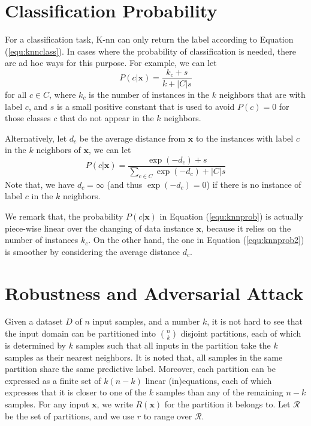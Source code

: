 \section{Classification Probability} 

For a classification task, K-nn can only return the label according to Equation (\ref{equ:knnclass}). In cases where the probability of classification is needed, there are ad hoc ways for this purpose. For example, we can let 
\begin{equation}\label{equ:knnprob}
    P(c | \textbf{x}) = \frac{k_c+s}{k+|C|s}
\end{equation}
for all $c\in C$, where $k_c$ is the number of instances in the $k$ neighbors that are with label $c$, and $s$ is a small positive constant that is used to avoid $P(c)=0$ for those classes $c$ that do not appear in the $k$ neighbors. 

Alternatively, let $d_c$ be the average distance from $\textbf{x}$ to the instances with label $c$ in the $k$ neighbors of $\textbf{x}$, we can let  
\begin{equation}\label{equ:knnprob2}
    P(c | \textbf{x}) = \frac{\exp(-d_c)+s}{\sum_{c\in C}\exp(-d_c)+|C|s}
\end{equation}
Note that, we have $d_c=\infty$ (and thus $\exp(-d_c)=0$) if there is no instance of label $c$ in the $k$ neighbors. 

We remark that, the probability $P(c | \textbf{x})$ in Equation (\ref{equ:knnprob}) is actually piece-wise linear over the changing of data instance $\textbf{x}$, because it relies on the number of instances $k_c$. On the other hand, the one in Equation (\ref{equ:knnprob2}) is smoother by considering the average distance $d_c$. 

\section{Robustness and Adversarial Attack} \label{sec:robustnessattackknn}

Given a dataset $D$ of $n$ input samples, and a number $k$, it is not hard to see that the input domain can be partitioned into ${n \choose k}$ disjoint partitions, each of which is determined by $k$ samples such that all inputs in the partition take the $k$ samples as their nearest neighbors. It is noted that, all samples in the same partition share the same predictive label. 
%
Moreover, each partition can be expressed as a finite set of $k(n-k)$ linear (in)equations, each of which expresses that it is closer to one of the $k$ samples than any of the remaining $n-k$ samples. 
%
For any input $\textbf{x}$, we write $R(\textbf{x})$ for the partition it belongs to. Let $\mathcal{R}$ be the set of partitions, and we use $r$ to range over $\mathcal{R}$. 

